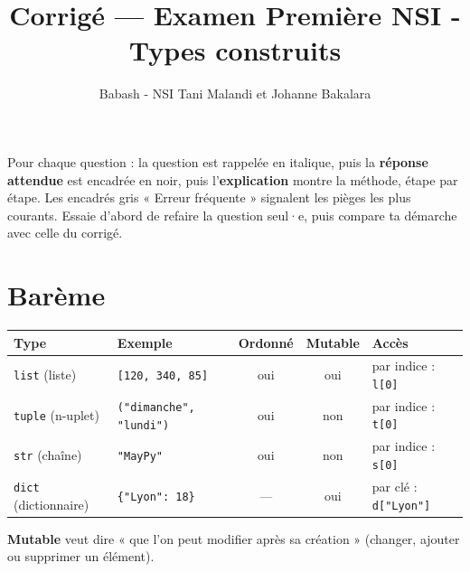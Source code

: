 \documentclass[addpoints, 11pt]{exam}
\title{Corrigé --- Examen Première NSI - Types construits}
\author{Babash - NSI Tani Malandi et Johanne Bakalara}
\date{}
\newcommand{\code}[1]{\texttt{#1}}
\DeclareRobustCommand{\_}{\textunderscore\allowbreak}
\begin{document}
\pagestyle{headandfoot}
\firstpageheader{}{}{}

\maketitle
\thispagestyle{headandfoot}

\begin{astuce}
Pour chaque question : la question est rappelée en italique, puis la \textbf{réponse attendue} est encadrée en noir, puis l'\textbf{explication} montre la méthode, étape par étape.
Les encadrés gris « Erreur fréquente » signalent les pièges les plus courants. Essaie d'abord de refaire la question seul·e, puis compare ta démarche avec celle du corrigé.
\end{astuce}

\section*{Barème}
\begin{center}
  \gradetable[h]
\end{center}

\begin{astuce}
\begin{center}
\small
\begin{tabular}{|l|l|c|c|l|}
\hline
Type & Exemple & Ordonné & \textbf{Mutable} & Accès \\ \hline
\code{list} (liste) & \code{[120, 340, 85]} & oui & oui & par indice : \code{l[0]} \\
\code{tuple} (n-uplet) & \code{("dimanche", "lundi")} & oui & non & par indice : \code{t[0]} \\
\code{str} (chaîne) & \code{"MayPy"} & oui & non & par indice : \code{s[0]} \\
\code{dict} (dictionnaire) & \code{\{"Lyon": 18\}} & --- & oui & par clé : \code{d["Lyon"]} \\ \hline
\end{tabular}
\end{center}
\textbf{Mutable} veut dire « que l'on peut modifier après sa création » (changer, ajouter ou supprimer un élément).
\end{astuce}
\end{document}
